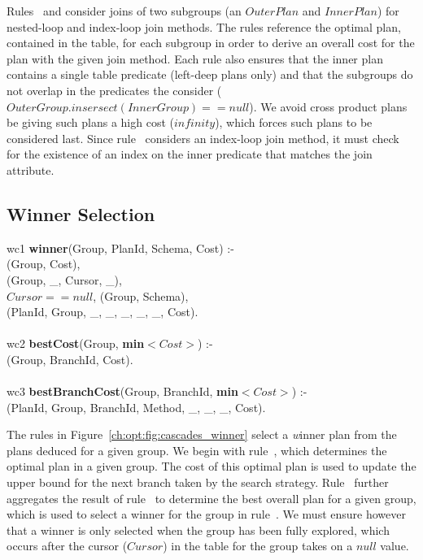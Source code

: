 Rules~ and  consider joins of two subgroups (an $OuterPlan$ and
$InnerPlan$) for nested-loop and index-loop join methods.  The rules reference
the optimal plan, contained in the  table, for each subgroup in
order to derive an overall cost for the plan with the given join method.  Each
rule also ensures that the inner plan contains a single table predicate
(left-deep plans only) and that the subgroups do not overlap in the predicates
the consider ($OuterGroup.insersect(InnerGroup) == null$).  We avoid cross
product plans be giving such plans a high cost ($infinity$), which forces such
plans to be considered last.  Since rule~ considers an index-loop join
method, it must check for the existence of an index on the inner predicate that
matches the join attribute.

\subsection{Winner Selection}
\label{ch:opt:sec:cascades_winner}

\begin{figure*}
\ssp
\centering
\begin{boxedminipage}{\linewidth}
wc1 {\bf winner}(Group, PlanId, Schema, Cost) :- \\
(Group, Cost), \\
(Group, \_, Cursor, \_), \\
\datalogspace $Cursor ==  null$,
(Group, Schema), \\
(PlanId, Group, \_, \_, \_, \_, \_, Cost). \\
\\
wc2 {\bf bestCost}(Group, {\bf min}$<Cost>$) :- \\
(Group, BranchId, Cost). \\
\\
wc3 {\bf bestBranchCost}(Group, BranchId, {\bf min}$<Cost>$) :- \\
(PlanId, Group, BranchId, Method, \_, \_, \_, Cost). \\
  
\end{boxedminipage}
\caption{\label{ch:opt:fig:cascades_winner} Cascades winner selection rules.}
\end{figure*}

The rules in Figure~\ref{ch:opt:fig:cascades_winner} select a {\emph winner}
plan from the plans deduced for a given group.  We begin with rule~,
which determines the optimal plan in a given group.  The cost of this optimal
plan is used to update the upper bound for the next branch taken by the search
strategy.  Rule~ further aggregates the result of rule~ to
determine the best overall plan for a given group, which is used to select a
winner for the group in rule~.  We must ensure however that a winner is
only selected when the group has been fully explored, which occurs after the
cursor ($Cursor$) in the  table for the group takes on a $null$
value.

